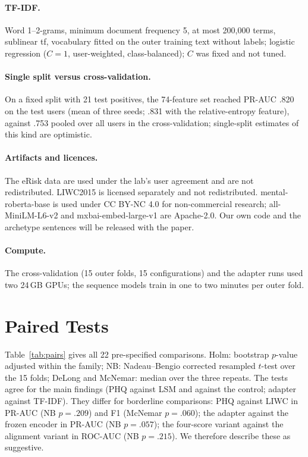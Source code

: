 \documentclass[11pt]{article}
\begin{document}
\paragraph{TF-IDF.}
Word 1--2-grams, minimum document frequency 5, at most 200{,}000 terms, sublinear tf, vocabulary fitted on the outer training text without labels; logistic regression ($C=1$, user-weighted, class-balanced); $C$ was fixed and not tuned.

\paragraph{Single split versus cross-validation.}
On a fixed split with 21 test positives, the 74-feature set reached PR-AUC .820 on the test users (mean of three seeds; .831 with the relative-entropy feature), against .753 pooled over all users in the cross-validation; single-split estimates of this kind are optimistic.

\paragraph{Artifacts and licences.}
The eRisk data are used under the lab's user agreement and are not redistributed.
LIWC2015 is licensed separately and not redistributed.
mental-roberta-base is used under CC BY-NC 4.0 for non-commercial research; all-MiniLM-L6-v2 and mxbai-embed-large-v1 are Apache-2.0.
Our own code and the archetype sentences will be released with the paper.

\paragraph{Compute.}
The cross-validation (15 outer folds, 15 configurations) and the adapter runs used two 24\,GB GPUs; the sequence models train in one to two minutes per outer fold.

\section{Paired Tests}
\label{app:pairs}

Table~\ref{tab:pairs} gives all 22 pre-specified comparisons.
Holm: bootstrap $p$-value adjusted within the family; NB: Nadeau--Bengio corrected resampled $t$-test over the 15 folds; DeLong and McNemar: median over the three repeats.
The tests agree for the main findings (PHQ against LSM and against the control; adapter against TF-IDF).
They differ for borderline comparisons: PHQ against LIWC in PR-AUC (NB $p=.209$) and F1 (McNemar $p=.060$); the adapter against the frozen encoder in PR-AUC (NB $p=.057$); the four-score variant against the alignment variant in ROC-AUC (NB $p=.215$).
We therefore describe these as suggestive.
\end{document}
